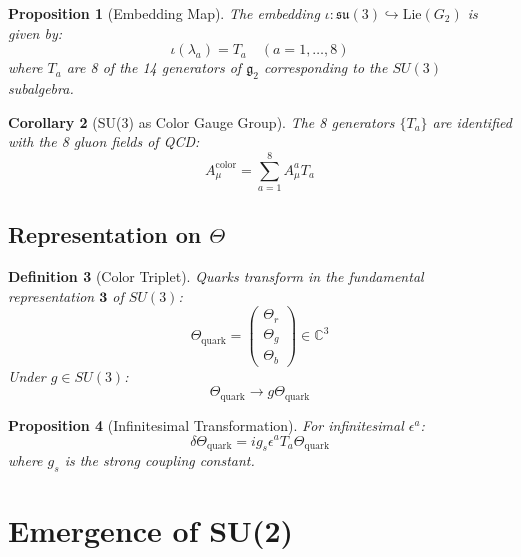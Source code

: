 \documentclass[12pt]{article}
\newtheorem{definition}{Definition}[section]
\newtheorem{corollary}[definition]{Corollary}
\newtheorem{proposition}[definition]{Proposition}
\newcommand{\C}{\mathbb{C}}
\newcommand{\su}{\mathfrak{su}}
\newcommand{\Lie}{\mathrm{Lie}}
\begin{document}
\begin{proposition}[Embedding Map]
The embedding $\iota: \su(3) \hookrightarrow \Lie(G_2)$ is given by:
\begin{equation}
\iota(\lambda_a) = T_a \quad (a = 1, \ldots, 8)
\end{equation}
where $T_a$ are 8 of the 14 generators of $\mathfrak{g}_2$ corresponding to the $SU(3)$ subalgebra.
\end{proposition}

\begin{corollary}[SU(3) as Color Gauge Group]
The 8 generators $\{T_a\}$ are identified with the 8 gluon fields of QCD:
\begin{equation}
A_\mu^{\mathrm{color}} = \sum_{a=1}^8 A_\mu^a T_a
\end{equation}
\end{corollary}

\subsection{Representation on $\Theta$}

\begin{definition}[Color Triplet]
Quarks transform in the fundamental representation $\mathbf{3}$ of $SU(3)$:
\begin{equation}
\Theta_{\mathrm{quark}} = \begin{pmatrix} \Theta_r \\ \Theta_g \\ \Theta_b \end{pmatrix} \in \C^3
\end{equation}
Under $g \in SU(3)$:
\begin{equation}
\Theta_{\mathrm{quark}} \to g \Theta_{\mathrm{quark}}
\end{equation}
\end{definition}

\begin{proposition}[Infinitesimal Transformation]
For infinitesimal $\epsilon^a$:
\begin{equation}
\delta \Theta_{\mathrm{quark}} = i g_s \epsilon^a T_a \Theta_{\mathrm{quark}}
\end{equation}
where $g_s$ is the strong coupling constant.
\end{proposition}

\section{Emergence of SU(2)}
\end{document}
